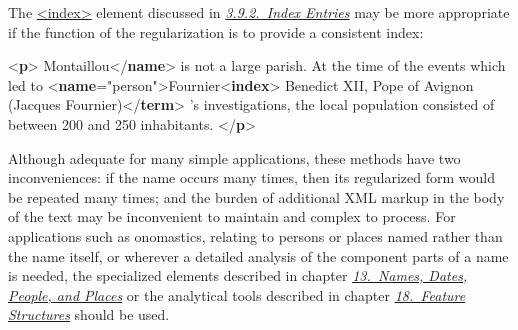 The \hyperref[TEI.index]{<index>} element discussed in \textit{\hyperref[CONOIX]{3.9.2.\ Index Entries}} may be more appropriate if the function of the regularization is to provide a consistent index: \par\bgroup{}\exampleFont \begin{shaded}\noindent\mbox{}{<\textbf{p}>}\mbox{}\newline 
{}Montaillou{</\textbf{name}>} is not a large parish.\mbox{}\newline 
 At the time of the events which led to\mbox{}\newline 
{<\textbf{name}\hspace*{1em}{type}="{person}">}Fournier{<\textbf{index}>}\mbox{}\newline 
\hspace*{1em}\hspace*{1em}Benedict XII, Pope of Avignon (Jacques Fournier){</\textbf{term}>}\mbox{}\newline 
\hspace*{1em}\mbox{}\newline 
{}'s\mbox{}\newline 
 investigations, the local population consisted of between 200 and 250 inhabitants.\mbox{}\newline 
{</\textbf{p}>}\end{shaded}\egroup\par \noindent  Although adequate for many simple applications, these methods have two inconveniences: if the name occurs many times, then its regularized form would be repeated many times; and the burden of additional XML markup in the body of the text may be inconvenient to maintain and complex to process. For applications such as onomastics, relating to persons or places named rather than the name itself, or wherever a detailed analysis of the component parts of a name is needed, the specialized elements described in chapter \textit{\hyperref[ND]{13.\ Names, Dates, People, and Places}} or the analytical tools described in chapter \textit{\hyperref[FS]{18.\ Feature Structures}} should be used.

